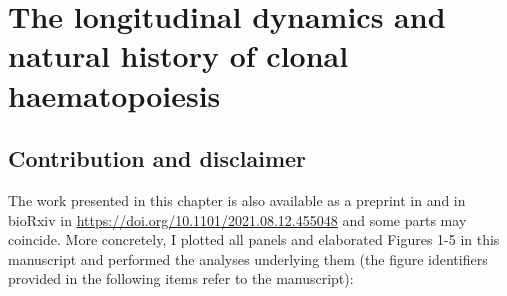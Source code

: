 \chapter{The longitudinal dynamics and natural history of clonal haematopoiesis}

\section{Contribution and disclaimer}

The work presented in this chapter is also available as a preprint in \cite{Fabre2021-uw} and in bioRxiv in \url{https://doi.org/10.1101/2021.08.12.455048} and some parts may coincide. More concretely, I plotted all panels and elaborated Figures 1-5 in this manuscript and performed the analyses underlying them (the figure identifiers provided in the following items refer to the manuscript):

